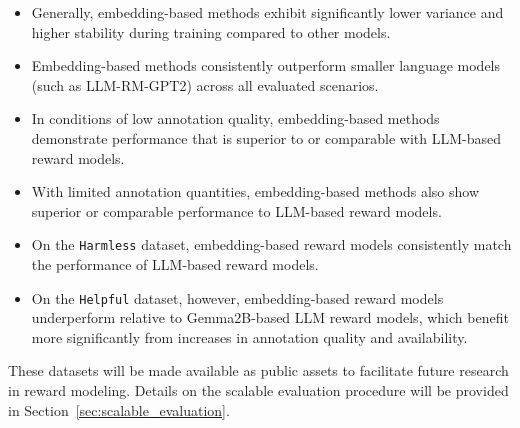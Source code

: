 \begin{itemize}[nosep,leftmargin=*]
\item Generally, embedding-based methods exhibit significantly lower variance and higher stability during training compared to other models. 
\item Embedding-based methods consistently outperform smaller language models (such as LLM-RM-GPT2) across all evaluated scenarios. 
\item In conditions of low annotation quality, embedding-based methods demonstrate performance that is superior to or comparable with LLM-based reward models. 
\item With limited annotation quantities, embedding-based methods also show superior or comparable performance to LLM-based reward models. 
\item On the \texttt{Harmless} dataset, embedding-based reward models consistently match the performance of LLM-based reward models. 
\item On the \texttt{Helpful} dataset, however, embedding-based reward models underperform relative to Gemma2B-based LLM reward models, which benefit more significantly from increases in annotation quality and availability. \end{itemize}

These datasets will be made available as public assets to facilitate future research in reward modeling. Details on the scalable evaluation procedure will be provided in Section~\ref{sec:scalable_evaluation}.
